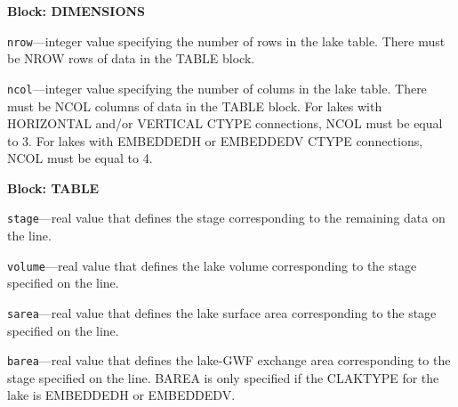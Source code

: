 
\item \textbf{Block: DIMENSIONS}

\begin{description}
\item \texttt{nrow}---integer value specifying the number of rows in the lake table. There must be NROW rows of data in the TABLE block.

\item \texttt{ncol}---integer value specifying the number of colums in the lake table. There must be NCOL columns of data in the TABLE block. For lakes with HORIZONTAL and/or VERTICAL CTYPE connections, NCOL must be equal to 3. For lakes with EMBEDDEDH or EMBEDDEDV CTYPE connections, NCOL must be equal to 4.

\end{description}
\item \textbf{Block: TABLE}

\begin{description}
\item \texttt{stage}---real value that defines the stage corresponding to the remaining data on the line.

\item \texttt{volume}---real value that defines the lake volume corresponding to the stage specified on the line.

\item \texttt{sarea}---real value that defines the lake surface area corresponding to the stage specified on the line.

\item \texttt{barea}---real value that defines the lake-GWF exchange area corresponding to the stage specified on the line. BAREA is only specified if the CLAKTYPE for the lake is EMBEDDEDH or EMBEDDEDV.

\end{description}


